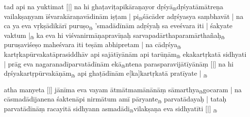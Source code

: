 \documentclass[article,12pt,a4paper]{memoir}%
\newcounter{parCount}
\begin{document}
	  
	  \pstart \leavevmode%
	tad api na yuktimat [|] na hi ghaṭaviṭapikāraṇayor dṛśyā{\tiny $_{lb}$}dṛśyatāmātreṇa vailakṣaṇyam īśvarakāraṇavādinām iṣṭam | pi{\tiny $_{lb}$}śācāder adṛśyasya saṃbhavāt | na ca ya eva vṛkṣādikārī puruṣo{\tiny $_{lb}$} 'smadādīnām adṛśyaḥ sa eveśvara iti | śakyate vaktum |{\tiny $_{lb}$} ka eva hi viśvanirmāṇapravīṇaḥ sarvapadārthaparamārthañaḥ{\tiny $_{lb}$} puruṣaviśeṣo maheśvara iti teṣām abhipretam | na cādṛśya{\tiny $_{lb}$}kartṛkapūrvakatāprasiddhāv api sajātīyānām api ta\leavevmode{}rūṇām{\tiny $_{lb}$} ekakartṛkatā sidhyati | prāg eva nagaranadīparvatādīnām ekā{\tiny $_{lb}$}ntena parasparavijātīyānāṃ [|] na hi dṛśyakartṛpūrvakāṇām{\tiny $_{lb}$} api ghaṭādīnām e[ka]kartṛkatā pratīyate |
	{}
	\pend%
      {\tiny $_{lb}$}

	  
	  \pstart \leavevmode%
	atha manyeta [|] jānīma eva vayam ātmātmamānānāṃ sāmarthya{\tiny $_{lb}$}gocaram | na cāsmadādijanena śaktenāpi nirmātum amī pāryante{\tiny $_{lb}$} parvatādayaḥ | tataḥ parvatādīnāṃ racayitā sidhyann asmadādi{\tiny $_{lb}$}vilakṣaṇa eva sidhyatīti [|]
	{}
	\pend%
      {\tiny $_{lb}$}
\end{document}
